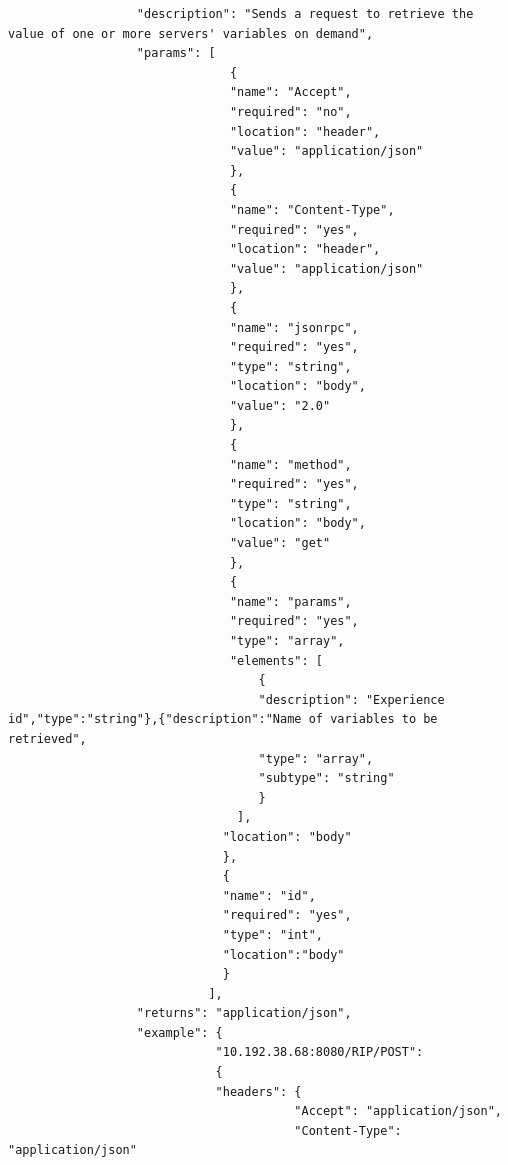 \begin{lstlisting}
                  "description": "Sends a request to retrieve the value of one or more servers' variables on demand",
                  "params": [
                               {
                               "name": "Accept",
                               "required": "no",
                               "location": "header",
                               "value": "application/json"
                               },
                               {
                               "name": "Content-Type",
                               "required": "yes",
                               "location": "header",
                               "value": "application/json"
                               },
                               {
                               "name": "jsonrpc",
                               "required": "yes",
                               "type": "string",
                               "location": "body",
                               "value": "2.0"
                               },
                               {
                               "name": "method",
                               "required": "yes",
                               "type": "string",
                               "location": "body",
                               "value": "get"
                               },
                               {
                               "name": "params",
                               "required": "yes",
                               "type": "array",
                               "elements": [
                                   {
                                   "description": "Experience id","type":"string"},{"description":"Name of variables to be retrieved",
                                   "type": "array",
                                   "subtype": "string"
                                   }
                                ],
                              "location": "body"
                              },
                              {
                              "name": "id",
                              "required": "yes",
                              "type": "int",
                              "location":"body"
                              }
                            ],
                  "returns": "application/json",
                  "example": {
                             "10.192.38.68:8080/RIP/POST": 
                             {
                             "headers": {
                                        "Accept": "application/json",
                                        "Content-Type": "application/json"

\end{lstlisting}
